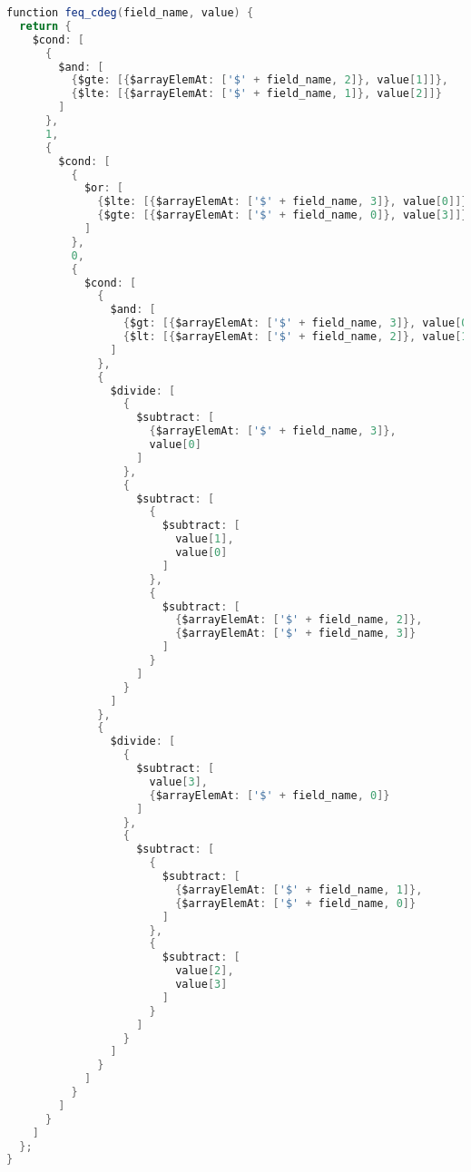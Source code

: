 \begin{lstlisting}[language=java, escapechar=|]
function feq_cdeg(field_name, value) {
  return {
    $cond: [
      {
        $and: [
          {$gte: [{$arrayElemAt: ['$' + field_name, 2]}, value[1]]},
          {$lte: [{$arrayElemAt: ['$' + field_name, 1]}, value[2]]}
        ]
      },
      1,
      {
        $cond: [
          {
            $or: [
              {$lte: [{$arrayElemAt: ['$' + field_name, 3]}, value[0]]},
              {$gte: [{$arrayElemAt: ['$' + field_name, 0]}, value[3]]}
            ]
          },
          0,
          {
            $cond: [
              {
                $and: [
                  {$gt: [{$arrayElemAt: ['$' + field_name, 3]}, value[0]]},
                  {$lt: [{$arrayElemAt: ['$' + field_name, 2]}, value[1]]}
                ]
              },
              {
                $divide: [
                  {
                    $subtract: [
                      {$arrayElemAt: ['$' + field_name, 3]},
                      value[0]
                    ]
                  },
                  {
                    $subtract: [
                      {
                        $subtract: [
                          value[1],
                          value[0]
                        ]
                      },
                      {
                        $subtract: [
                          {$arrayElemAt: ['$' + field_name, 2]},
                          {$arrayElemAt: ['$' + field_name, 3]}
                        ]
                      }
                    ]
                  }
                ]
              },
              {
                $divide: [
                  {
                    $subtract: [
                      value[3],
                      {$arrayElemAt: ['$' + field_name, 0]}
                    ]
                  },
                  {
                    $subtract: [
                      {
                        $subtract: [
                          {$arrayElemAt: ['$' + field_name, 1]},
                          {$arrayElemAt: ['$' + field_name, 0]}
                        ]
                      },
                      {
                        $subtract: [
                          value[2],
                          value[3]
                        ]
                      }
                    ]
                  }
                ]
              }
            ]
          }
        ]
      }
    ]
  };
}


\end{lstlisting}
